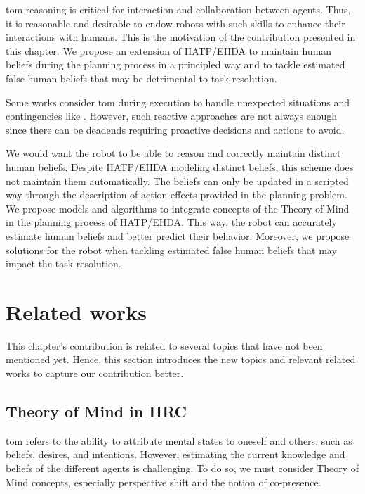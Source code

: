\acrfull{tom} reasoning is critical for interaction and collaboration between agents. Thus, it is reasonable and desirable to endow robots with such skills to enhance their interactions with humans. This is the motivation of the contribution presented in this chapter. We propose an extension of HATP/EHDA to maintain human beliefs during the planning process in a principled way and to tackle estimated false human beliefs that may be detrimental to task resolution.

Some works consider \acrshort{tom} during execution to handle unexpected situations and contingencies like \cite{devin_implemented_2016}. 
However, such reactive approaches are not always enough since there can be deadends requiring proactive decisions and actions to avoid. 

We would want the robot to be able to reason and correctly maintain distinct human beliefs. Despite HATP/EHDA modeling distinct beliefs, this scheme does not maintain them automatically. The beliefs can only be updated in a scripted way through the description of action effects provided in the planning problem. We propose models and algorithms to integrate concepts of the Theory of Mind in the planning process of HATP/EHDA. This way, the robot can accurately estimate human beliefs and better predict their behavior. Moreover, we propose solutions for the robot when tackling estimated false human beliefs that may impact the task resolution.


\section{Related works}

    This chapter's contribution is related to several topics that have not been mentioned yet. Hence, this section introduces the new topics and relevant related works to capture our contribution better.  

    \subsection{Theory of Mind in HRC}
    \acrfull{tom} refers to the ability to attribute mental states to oneself and others, such as beliefs, desires, and intentions. However, estimating the current knowledge and beliefs of the different agents is challenging. To do so, we must consider Theory of Mind concepts, especially perspective shift and the notion of co-presence.
    
